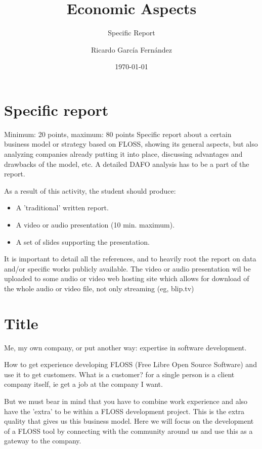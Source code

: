 \documentclass[11pt]{scrartcl}
\title{\textbf{Economic Aspects\\}}
\subtitle{Specific Report}
\author{Ricardo Garc\'ia Fern\'andez}
\date{\today}
\begin{document}
\maketitle

\tableofcontents

\newpage

\section{Specific report}

Minimum: 20 points, maximum: 80 points
Specific report about a certain business model or strategy based on FLOSS, showing its general aspects, but also analyzing companies already putting it into place, discussing advantages and drawbacks of the model, etc. A detailed DAFO analysis has to be a part of the report.

As a result of this activity, the student should produce:
\begin{itemize}
    \item A 'traditional' written report.
    \item A video or audio presentation (10 min. maximum).
    \item A set of slides supporting the presentation.
\end{itemize}

It is important to detail all the references, and to heavily root the report on data and/or specific works publicly available. The video or audio presentation wil be uploaded to some audio or video web hosting site which allows for download of the whole audio or video file, not only streaming (eg, blip.tv)

\section{Title}

\par Me, my own company, or put another way: expertise in software development.

\par How to get experience developing FLOSS (Free Libre Open Source Software) and use it to get customers. What is a customer? for a single person is a client company itself, ie get a job at the company I want.

\par But we must bear in mind that you have to combine work experience and also have the 'extra' to be within a FLOSS development project. This is the extra quality that gives us this business model. Here we will focus on the development of a FLOSS tool by connecting with the community around us and use this as a gateway to the company.
\end{document}
